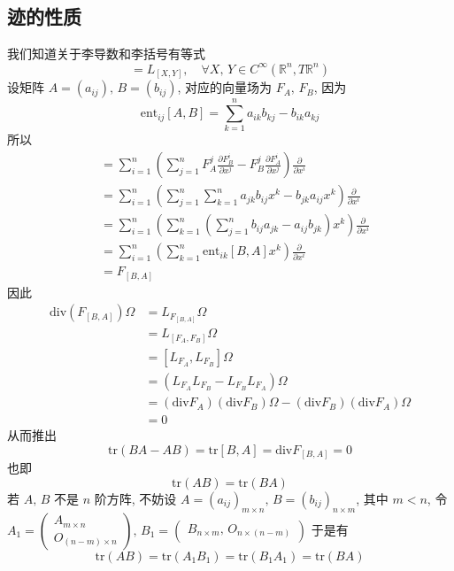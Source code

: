     \subsection{迹的性质}
    我们知道关于李导数和李括号有等式
    \begin{equation*}
        [L_X, L_Y] = L_{[X,Y]}, \quad\forall X,\,Y\in C^{\infty}(\mathbb{R}^n,T\mathbb{R}^n)
    \end{equation*}
    设矩阵 $A = (a_{ij}),\,B = (b_{ij})$, 对应的向量场为 $F_A,\,F_B$, 因为
    \begin{equation*}
        \mathrm{ent}_{ij}[A,B] = \sum_{k=1}^{n}a_{ik}b_{kj}-b_{ik}a_{kj}
    \end{equation*}
    所以
    \begin{align*}
        [F_A,F_B] &= \sum_{i=1}^{n}\left(\sum_{j=1}^{n}F_A^j\frac{\partial F_B^i}{\partial x^j}-F_B^j\frac{\partial F_A^i}{\partial x^j}\right)\frac{\partial}{\partial x^i} \\
        &= \sum_{i=1}^{n}\left(\sum_{j=1}^{n}\sum_{k=1}^{n}a_{jk}b_{ij}x^k-b_{jk}a_{ij}x^k\right)\frac{\partial}{\partial x^i} \\
        &= \sum_{i=1}^{n}\left(\sum_{k=1}^{n}\left(\sum_{j=1}^{n}b_{ij}a_{jk}-a_{ij}b_{jk}\right)x^k\right)\frac{\partial}{\partial x^i} \\
        &= \sum_{i=1}^{n}\left(\sum_{k=1}^{n}\mathrm{ent}_{ik}[B,A]x^k\right)\frac{\partial}{\partial x^i} \\
        &= F_{[B,A]}
    \end{align*}
    因此
    \begin{align*}
        \mathrm{div}(F_{[B,A]})\Omega &= L_{F_{[B,A]}}\Omega \\
        &= L_{[F_A,F_B]}\Omega \\
        &= [L_{F_A},L_{F_B}]\Omega \\
        &= (L_{F_A}L_{F_B}-L_{F_B}L_{F_A})\Omega \\
        &= (\mathrm{div}F_A)(\mathrm{div}F_B)\Omega - (\mathrm{div}F_B)(\mathrm{div}F_A)\Omega \\
        &= 0
    \end{align*}
    从而推出
    \begin{equation*}
        \mathrm{tr}(BA-AB) = \mathrm{tr}[B,A] = \mathrm{div}F_{[B,A]} = 0
    \end{equation*}
    也即
    \begin{equation*}
        \mathrm{tr}(AB) = \mathrm{tr}(BA)
    \end{equation*}
    若 $A,\,B$ 不是 $n$ 阶方阵, 不妨设 $A = (a_{ij})_{m\times n},\,B = (b_{ij})_{n\times m}$, 其中 $m<n$,
    令 $A_1 = \begin{pmatrix}
        A_{m\times n} \\ O_{(n-m)\times n}
    \end{pmatrix},\,B_1 = \begin{pmatrix}
        B_{n\times m},\,O_{n\times(n-m)}
    \end{pmatrix}$
    于是有
    \begin{equation*}
        \mathrm{tr}(AB) = \mathrm{tr}(A_1B_1) = \mathrm{tr}(B_1A_1) = \mathrm{tr}(BA)
    \end{equation*}

